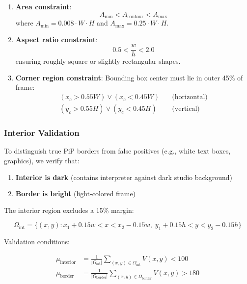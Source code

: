 \documentclass[11pt,a4paper]{article}
\begin{document}
\begin{enumerate}
    \item \textbf{Area constraint}: 
    \begin{equation}
    A_{\text{min}} < A_{\text{contour}} < A_{\text{max}}
    \end{equation}
    where $A_{\text{min}} = 0.008 \cdot W \cdot H$ and $A_{\text{max}} = 0.25 \cdot W \cdot H$.
    
    \item \textbf{Aspect ratio constraint}:
    \begin{equation}
    0.5 < \frac{w}{h} < 2.0
    \end{equation}
    ensuring roughly square or slightly rectangular shapes.
    
    \item \textbf{Corner region constraint}: Bounding box center must lie in outer 45\% of frame:
    \begin{align}
    (x_c > 0.55W) \vee (x_c < 0.45W) &\quad \text{(horizontal)} \\
    (y_c > 0.55H) \vee (y_c < 0.45H) &\quad \text{(vertical)}
    \end{align}
\end{enumerate}

\subsubsection{Interior Validation}

To distinguish true PiP borders from false positives (e.g., white text boxes, graphics), we verify that:

\begin{enumerate}
    \item \textbf{Interior is dark} (contains interpreter against dark studio background)
    \item \textbf{Border is bright} (light-colored frame)
\end{enumerate}

The interior region excludes a 15\% margin:

\begin{equation}
\Omega_{\text{int}} = \{(x, y) : x_1 + 0.15w < x < x_2 - 0.15w, \; y_1 + 0.15h < y < y_2 - 0.15h\}
\end{equation}

Validation conditions:

\begin{align}
\mu_{\text{interior}} &= \frac{1}{|\Omega_{\text{int}}|} \sum_{(x,y) \in \Omega_{\text{int}}} V(x, y) < 100 \\
\mu_{\text{border}} &= \frac{1}{|\Omega_{\text{border}}|} \sum_{(x,y) \in \Omega_{\text{border}}} V(x, y) > 180
\end{align}
\end{document}
